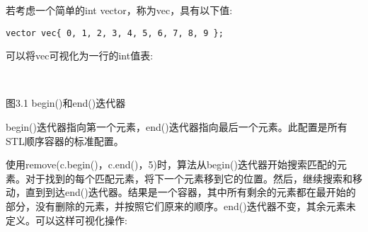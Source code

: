 若考虑一个简单的int vector，称为vec，具有以下值:

\begin{lstlisting}[style=styleCXX]
vector vec{ 0, 1, 2, 3, 4, 5, 6, 7, 8, 9 };
\end{lstlisting}

可以将vec可视化为一行的int值表:

\hspace*{\fill} \\ %
\begin{center}

图3.1  begin()和end()迭代器
\end{center}

begin()迭代器指向第一个元素，end()迭代器指向最后一个元素。此配置是所有STL顺序容器的标准配置。

使用remove(c.begin()，c.end()，5)时，算法从begin()迭代器开始搜索匹配的元素。对于找到的每个匹配元素，将下一个元素移到它的位置。然后，继续搜索和移动，直到到达end()迭代器。结果是一个容器，其中所有剩余的元素都在最开始的部分，没有删除的元素，并按照它们原来的顺序。end()迭代器不变，其余元素未定义。可以这样可视化操作:

